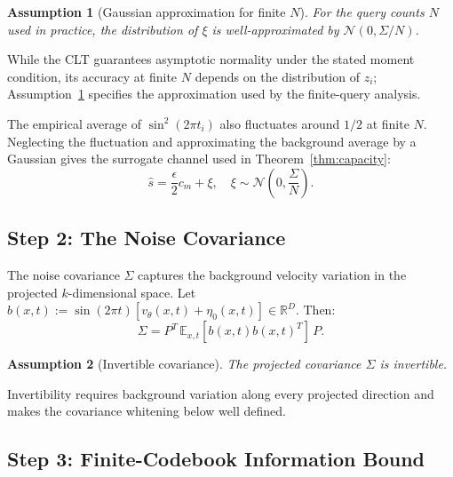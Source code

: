\documentclass[11pt]{article}
\newtheorem{assumption}{Assumption}
\begin{document}
\begin{assumption}[Gaussian approximation for finite $N$]\label{ass:gaussian}
For the query counts $N$ used in practice, the distribution of $\xi$ is
well-approximated by $\mathcal{N}(0, \Sigma/N)$.
\end{assumption}

While the CLT guarantees asymptotic normality under the stated moment
condition, its accuracy at finite $N$ depends on the distribution of
$z_i$; Assumption~\ref{ass:gaussian} specifies the approximation used
by the finite-query analysis.

The empirical average of $\sin^2(2\pi t_i)$ also fluctuates around
$1/2$ at finite $N$. Neglecting the fluctuation
and approximating the background average by a Gaussian gives the
surrogate channel used in Theorem~\ref{thm:capacity}:
\begin{equation}\label{eq:channel_final}
\boxed{\hat{s} = \frac{\epsilon}{2} c_m + \xi, \quad \xi \sim \mathcal{N}\!\left(0, \frac{\Sigma}{N}\right).}
\end{equation}

\subsection{Step 2: The Noise Covariance}

The noise covariance $\Sigma$ captures the background velocity variation
in the projected $k$-dimensional space. Let
$b(x,t) := \sin(2\pi t)[v_\theta(x,t) + \eta_0(x,t)] \in \mathbb{R}^D$.
Then:
\begin{equation}
\Sigma = P^T \, \mathbb{E}_{x,t}[b(x,t) b(x,t)^T] \, P.
\end{equation}

\begin{assumption}[Invertible covariance]\label{ass:invertible}
The projected covariance $\Sigma$ is invertible.
\end{assumption}

Invertibility requires background variation along every projected
direction and makes the covariance whitening below well defined.

\subsection{Step 3: Finite-Codebook Information Bound}
\end{document}
